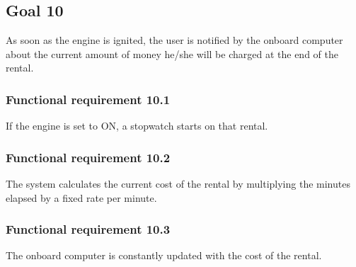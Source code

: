 \subsection{Goal 10}
As soon as the engine is ignited, the user is notified by the onboard computer about the current amount of money he/she will be charged at the end of the rental.

\setcounter{secnumdepth}{3}
\subsubsection{Functional requirement 10.1}
If the engine is set to ON, a stopwatch starts on that rental.

\subsubsection{Functional requirement 10.2}
The system calculates the current cost of the rental by multiplying the minutes elapsed by a fixed rate per minute.

\subsubsection{Functional requirement 10.3}
The onboard computer is constantly updated with the cost of the rental.